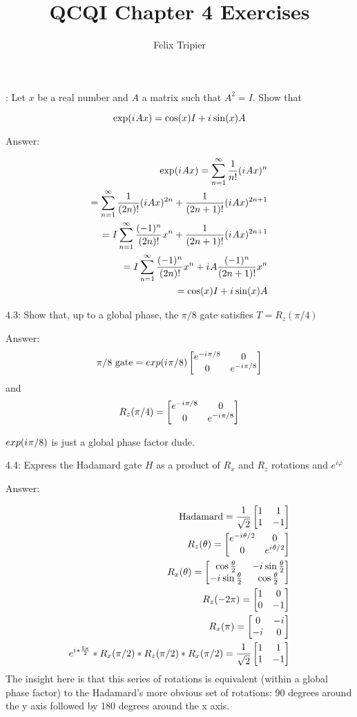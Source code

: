 \documentclass[12pt, letterpaper, twoside]{article}
\title{QCQI Chapter 4 Exercises}
\author{Felix Tripier}
\newcommand{\iu}{{i\mkern1mu}}
\newcommand{\Hadamard}{\frac{1}{\sqrt{2}}
\begin{bmatrix}
    1 & 1 \\
    1 & -1
\end{bmatrix}}
\newcommand{\Rz}{\begin{bmatrix}
        e^{-\iu\theta/2} & 0 \\
        0 & e^{\iu\theta/2}
    \end{bmatrix}}
\newcommand{\halftheta}{\frac{\theta}{2}}
\newcommand{\Rx}{\begin{bmatrix}
    \cos{\halftheta} & -\iu\sin{\halftheta} \\
    -\iu\sin{\halftheta} & \cos{\halftheta}
\end{bmatrix}}
\newcommand{\twoXtwo}[4]{\begin{bmatrix}
    #1 & #3 \\
    #2 & #4
\end{bmatrix}}
\begin{document}
: Let $x$ be a real number and $A$ a matrix such that $A^2 = I$. Show that

$$
	\exp(\iu Ax) = \cos(x)I + \iu \sin(x)A
$$

Answer:

\begin{subequations}
\begin{align}
	\exp(\iu Ax) = \sum_{n=1}^{\infty} \frac{1}{n!} (\iu Ax)^n                                \\
	= \sum_{n=1}^{\infty} \frac{1}{(2n)!} (\iu Ax)^{2n} + \frac{1}{(2n + 1)!} (\iu Ax)^{2n+1} \\
	= I\sum_{n=1}^{\infty} \frac{(-1)^n}{(2n)!} x^{n} + \frac{1}{(2n + 1)!} (\iu Ax)^{2n+1}   \\
	= I\sum_{n=1}^{\infty} \frac{(-1)^n}{(2n)!} x^{n} + \iu A\frac{(-1)^n}{(2n + 1)!} x^n     \\
	= \cos(x)I + \iu \sin(x)A
\end{align}
\end{subequations}

4.3: Show that, up to a global phase, the $\pi/8$ gate satisfies $T = R_z(\pi/4)$

Answer:
\[
    \pi/8 \text{ gate} =
    exp(\iu\pi/8)
\begin{bmatrix}
    e^{-\iu \pi/8} & 0 \\
    0 & e^{-\iu \pi/8}
\end{bmatrix}
\]
and
\[
    R_z(\pi/4) =
\begin{bmatrix}
    e^{-\iu \pi/8} & 0 \\
    0 & e^{-\iu \pi/8}
\end{bmatrix}
\]

$exp(\iu\pi/8)$ is just a global phase factor dude.


4.4: Express the Hadamard gate $H$ as a product of $R_x$ and $R_z$ rotations and $e^{i\varphi}$

Answer:

\begin{subequations}
\begin{align}
    \text{Hadamard} = \Hadamard \\
    R_z(\theta) = \Rz\\
    R_x(\theta) = \Rx\\
    R_z(-2\pi) = \twoXtwo{1}{0}{0}{-1}\\
    R_x(\pi) = \twoXtwo{0}{-\iu}{-\iu}{0}\\
    e^{\iu*\frac{5\pi}{2}} * R_x(\pi/2) * R_z(\pi/2) * R_x(\pi/2) = \Hadamard
\end{align}
\end{subequations}
The insight here is that this series of rotations is equivalent (within a global phase factor) to the Hadamard's more obvious set of rotations: 90 degrees around the y axis followed by 180 degrees around the x axis.
\end{document}
